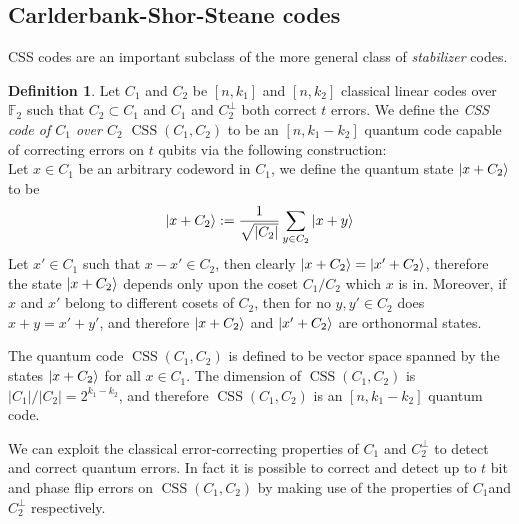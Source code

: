 \documentclass[11pt,a4paper]{article}
\theoremstyle{definition}
\newtheorem{definition}{Definition}[section]
\theoremstyle{plain}
\theoremstyle{remark}
\begin{document}
\subsection{Carlderbank-Shor-Steane codes}
CSS codes are an important subclass of the more general class of \emph{stabilizer} codes. 
\begin{definition}
Let $C_1$ and $C_2$ be $[n, k_1]$ and $[n, k_2]$ classical linear codes over $\mathbb{F}_2$ such that $C_2 \subset C_1$ and $C_1$ and $C_2^\perp$ both correct 
$t$ errors. We define the \emph{CSS code of $C_1$ over $C_2$ $\operatorname{CSS}(C_1, C_2)$} to be an $[n, k_1 - k_2]$ quantum code capable of correcting errors on $t$ qubits via the following construction: \\
Let $x \in C_1$ be an arbitrary codeword in $C_1$, we define the quantum state $\ket{x + C_2}$ to be 
$$\ket{x + C_2} := \frac{1}{\sqrt{|C_2|}} \sum_{y \in C_2} \ket{x + y}$$
Let $x' \in C_1$ such that $x - x' \in C_2$, then clearly $\ket{x + C_2} = \ket{x' + C_2}$, therefore the state $\ket{x + C_2}$ depends only upon the coset $C_1 / C_2$ which $x$ is in. 
Moreover, if $x$ and $x'$ belong to different cosets of $C_2$, then for no $y, y' \in C_2$ does $x + y = x' + y'$, and therefore $\ket{x + C_2}$ and $\ket{x' + C_2}$ are orthonormal states. 

The quantum code $\operatorname{CSS}(C_1, C_2)$ is defined to be vector space spanned by the states $\ket{x + C_2}$ for all $x \in C_1$. 
The dimension of $\operatorname{CSS}(C_1, C_2)$ is $|C_1|/|C_2| = 2^{k_1 - k_2}$, and therefore $\operatorname{CSS}(C_1, C_2)$ is an 
$[n, k_1 - k_2]$ quantum code.

We can exploit the classical error-correcting properties of $C_1$ and $C_2^\perp$ to detect and correct quantum errors. 
In fact it is possible to correct and detect up to $t$ bit and phase flip errors on $\operatorname{CSS}(C_1, C_2)$ by making use 
of the properties of $C_1 $and $C_2^\perp$ respectively. 
\end{definition}
\end{document}
